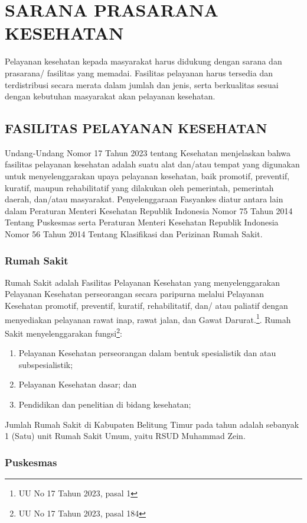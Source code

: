 \chapter{SARANA PRASARANA KESEHATAN}
Pelayanan kesehatan kepada masyarakat harus didukung dengan sarana dan prasarana/ fasilitas yang memadai. Fasilitas pelayanan harus tersedia dan terdistribusi secara merata dalam jumlah dan jenis, serta berkualitas sesuai dengan kebutuhan masyarakat akan pelayanan kesehatan. 

\section{FASILITAS PELAYANAN KESEHATAN}
Undang-Undang Nomor 17 Tahun 2023 tentang Kesehatan menjelaskan bahwa fasilitas pelayanan kesehatan adalah suatu alat dan/atau tempat yang digunakan untuk menyelenggarakan upaya pelayanan kesehatan, baik promotif, preventif, kuratif, maupun rehabilitatif yang dilakukan oleh pemerintah, pemerintah daerah, dan/atau masyarakat. Penyelenggaraan Fasyankes diatur antara lain dalam Peraturan Menteri Kesehatan Republik Indonesia Nomor 75 Tahun 2014 Tentang Puskesmas serta Peraturan Menteri Kesehatan Republik Indonesia Nomor 56 Tahun 2014 Tentang Klasifikasi dan Perizinan Rumah Sakit.

\subsection{Rumah Sakit}
Rumah Sakit adalah Fasilitas Pelayanan Kesehatan yang menyelenggarakan Pelayanan Kesehatan perseorangan secara paripurna melalui Pelayanan Kesehatan promotif, preventif, kuratif, rehabilitatif, dan/ atau paliatif dengan menyediakan pelayanan rawat inap, rawat jalan, dan Gawat Darurat.\footnote{UU No 17 Tahun 2023, pasal 1}. Rumah Sakit menyelenggarakan fungsi\footnote{UU No 17 Tahun 2023, pasal 184}:
\begin{enumerate}
  \item Pelayanan Kesehatan perseorangan dalam bentuk spesialistik dan atau subspesialistik;
  \item Pelayanan Kesehatan dasar; dan
  \item Pendidikan dan penelitian di bidang kesehatan;
\end{enumerate}

Jumlah Rumah Sakit di Kabupaten Belitung Timur pada tahun \tP adalah sebanyak 1 (Satu) unit Rumah Sakit Umum, yaitu RSUD Muhammad Zein.

\subsection{Puskesmas}

